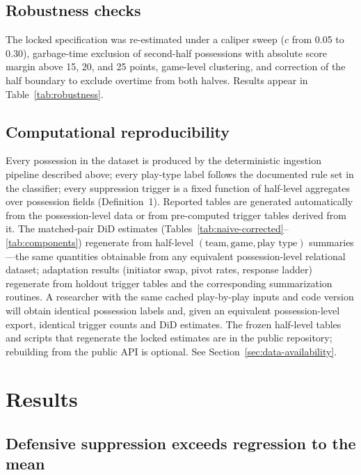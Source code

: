 \documentclass[11pt]{article}
\begin{document}
\subsection{Robustness checks}

The locked specification was re-estimated under a caliper sweep ($c$ from 0.05 to 0.30), garbage-time exclusion of second-half possessions with absolute score margin above 15, 20, and 25 points, game-level clustering, and correction of the half boundary to exclude overtime from both halves. Results appear in Table~\ref{tab:robustness}.

\subsection{Computational reproducibility}

Every possession in the dataset is produced by the deterministic ingestion pipeline described above; every play-type label follows the documented rule set in the classifier; every suppression trigger is a fixed function of half-level aggregates over possession fields (Definition~1). Reported tables are generated automatically from the possession-level data or from pre-computed trigger tables derived from it. The matched-pair DiD estimates (Tables~\ref{tab:naive-corrected}--\ref{tab:components}) regenerate from half-level $(\text{team}, \text{game}, \text{play type})$ summaries---the same quantities obtainable from any equivalent possession-level relational dataset; adaptation results (initiator swap, pivot rates, response ladder) regenerate from holdout trigger tables and the corresponding summarization routines. A researcher with the same cached play-by-play inputs and code version will obtain identical possession labels and, given an equivalent possession-level export, identical trigger counts and DiD estimates. The frozen half-level tables and scripts that regenerate the locked estimates are in the public repository; rebuilding from the public API is optional. See Section~\ref{sec:data-availability}.

\section{Results}
\label{sec:results}

\subsection{Defensive suppression exceeds regression to the mean}
\end{document}
